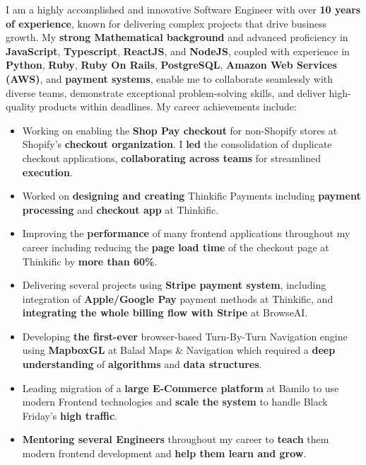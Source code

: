 I am a highly accomplished and innovative Software Engineer with over \textbf{10 years of experience}, known for delivering complex projects that drive business growth. My \textbf{strong Mathematical background} and advanced proficiency in \textbf{JavaScript}, \textbf{Typescript}, \textbf{ReactJS}, and \textbf{NodeJS}, coupled with experience in \textbf{Python}, \textbf{Ruby}, \textbf{Ruby On Rails}, \textbf{PostgreSQL}, \textbf{Amazon Web Services (AWS)}, and \textbf{payment systems}, enable me to collaborate seamlessly with diverse teams, demonstrate exceptional problem-solving skills, and deliver high-quality products within deadlines. My career achievements include:
\medskip
\begin{itemize}
    \item Working on enabling the \textbf{Shop Pay checkout} for non-Shopify stores at Shopify's \textbf{checkout organization}. I \textbf{led} the consolidation of duplicate checkout applications, \textbf{collaborating across teams} for streamlined \textbf{execution}.
    \item Worked on \textbf{designing and creating} Thinkific Payments including \textbf{payment processing} and \textbf{checkout app} at Thinkific.
    \item Improving the \textbf{performance} of many frontend applications throughout my career including reducing the \textbf{page load time} of the checkout page at Thinkific by \textbf{more than 60\%}.
    \item Delivering several projects using \textbf{Stripe payment system}, including integration of \textbf{Apple/Google Pay} payment methods at Thinkific, and \textbf{integrating the whole billing flow with Stripe} at BrowseAI.
    \item Developing \textbf{the first-ever} browser-based Turn-By-Turn Navigation engine using \textbf{MapboxGL} at Balad Maps \& Navigation which required a \textbf{deep understanding} of \textbf{algorithms} and \textbf{data structures}.
    \item Leading migration of a \textbf{large E-Commerce platform} at Bamilo to use modern Frontend technologies and \textbf{scale the system} to handle Black Friday's \textbf{high traffic}.
    \item \textbf{Mentoring several Engineers} throughout my career to \textbf{teach} them modern frontend development and \textbf{help them learn and grow}.
\end{itemize}

\null
\vfill
\null

